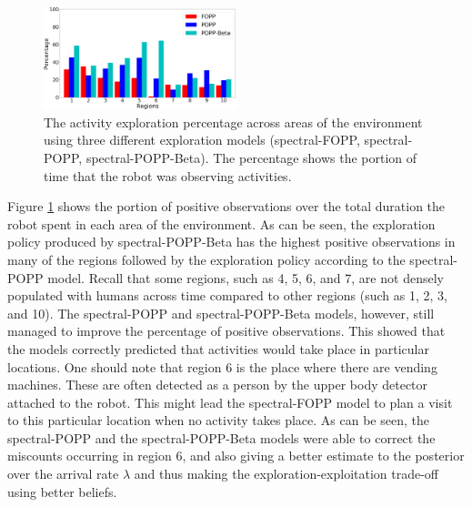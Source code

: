 \begin{figure}[t!]
	\centering
	\includegraphics[width=0.5\textwidth]{./figures/exploration_percentage_region.png}
	\caption{The activity exploration percentage across areas of the environment using three different exploration models (spectral-FOPP, spectral-POPP, spectral-POPP-Beta). The percentage shows the portion of time that the robot was observing activities.}
	\label{fig:exploration_percentage_region}
\end{figure}

Figure \ref{fig:exploration_percentage_region} shows the portion of positive observations over the total duration the robot spent in each area of the environment. As can be seen, the exploration policy produced by spectral-POPP-Beta has the highest positive observations in many of the regions followed by the exploration policy according to the spectral-POPP model. Recall that some regions, such as 4, 5, 6, and 7, are not densely populated with humans across time compared to other regions (such as 1, 2, 3, and 10). The spectral-POPP and spectral-POPP-Beta models, however, still managed to improve the percentage of positive observations. This showed that the models correctly predicted that activities would take place in particular locations. One should note that region 6 is the place where there are vending machines. These are often detected as a person by the upper body detector attached to the robot. This might lead the spectral-FOPP model to plan a visit to this particular location when no activity takes place. As can be seen, the spectral-POPP and the spectral-POPP-Beta models were able to correct the miscounts occurring in region 6, and also giving a better estimate to the posterior over the arrival rate $\lambda$ and thus making the exploration-exploitation trade-off using better beliefs.